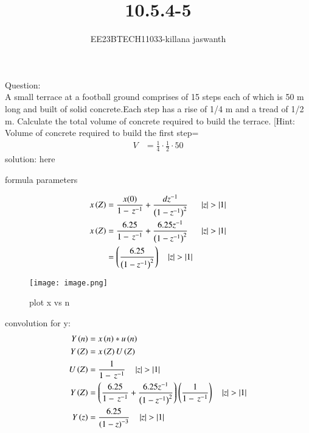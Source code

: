 \documentclass[journal,12pt,twocolumn]{IEEEtran}
\theoremstyle{remark}
\begin{document}

\vspace{3cm}

\title{10.5.4-5}
\author{EE23BTECH11033-killana jaswanth}
\maketitle
\newpage

\bigskip

\renewcommand{\thefigure}{\theenumi}
\renewcommand{\thetable}{\theenumi}
Question:\\
A small terrace at a football ground comprises of 15 steps each of which is 50
m long and built of solid concrete.Each step has a rise of 1/4 m and a tread of
1/2 m. Calculate the total volume of concrete required to build the terrace.
[Hint: Volume of concrete required to build the first step=\begin{align}
    V&=\frac{1}{4} \cdot \frac{1}{2} \cdot 50 
\end{align}
solution:
here\begin{table}[!ht]
 \centering
  
   \caption{formula parameters}
   \label{tab:10.5.4.5}
   \end{table}
\begin{align}
x\left(Z\right)&=\frac{x(0)}{1-\,z^{-1}}+\frac{dz^{-1}}{\left(1-{z^{-1}}\right)^2}\:\:
\quad\left\vert z\right\vert>\left\vert1\right\vert\\
x\left(Z\right)&=\frac{6.25}{1-\,z^{-1}}+\frac{6.25z^{-1}}{\left(1-{z^{-1}}\right)^2}\:\:\quad\left\vert z\right\vert>\left\vert1\right\vert\\
&=\left(\frac{6.25}{\left(1-z^{-1}\right)^2}\right) \quad\left\vert z\right\vert>\left\vert1\right\vert\\
\end{align}
\begin{figure}[!ht]
    \centering
    \texttt{[image: image.png]}
    \caption{plot x vs n}
    \label{fig:enter-label}
\end{figure}
convolution for y:\\
\begin{align}
Y\left(n\right)&=x\left(n\right)*u\left(n\right)\\
Y\left(Z\right)&=x\left(Z\right)U\left(Z\right)\\
U\left(Z\right)&=\frac{1}{1-\,z^{-1}}\quad\left\vert z\right\vert>\left\vert1\right\vert\\
Y\left(Z\right)&=\left(\frac{6.25}{1-\,z^{-1}}+\frac{6.25z^{-1}}{\left(1-{z^{-1}}\right)^2}\right)\left(\frac{1}{1-\,z^{-1}}\right)\quad\left\vert z\right\vert>\left\vert1\right\vert\\
Y\left(z\right)&=\frac{6.25}{\left(1-z\right)^{-3}} \quad\left\vert z\right\vert>\left\vert1\right\vert\\
\end{align}
\end{document}
